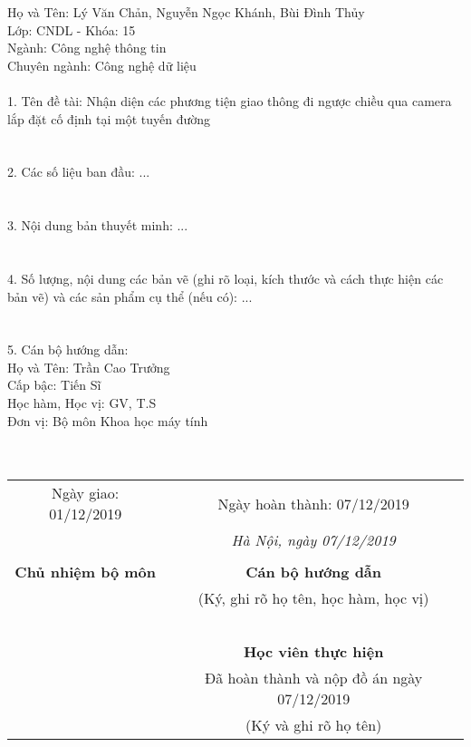 \large{
	\noindent Họ và Tên: Lý Văn Chản, Nguyễn Ngọc Khánh, Bùi Đình Thủy\\
	Lớp: CNDL - Khóa: 15\\
	Ngành: Công nghệ thông tin\\
	Chuyên ngành: Công nghệ dữ liệu\\\\
	1. Tên đề tài: Nhận diện các phương tiện giao thông đi ngược chiều qua camera lắp đặt cố định tại một tuyến đường\\\\\\
	2. Các số liệu ban đầu: ...\\\\\\
	3. Nội dung bản thuyết minh: ...\\\\\\
	4. Số lượng, nội dung các bản vẽ (ghi rõ loại, kích thước và cách thực hiện các bản vẽ) và các sản phẩm cụ thể (nếu có): ...\\\\\\
	5. Cán bộ hướng dẫn:\\
	\indent Họ và Tên: Trần Cao Trưởng\\
	\indent Cấp bậc: Tiến Sĩ\\
	\indent Học hàm, Học vị: GV, T.S\\
	\indent Đơn vị: Bộ môn Khoa học máy tính\\\\\\
}

\hskip-2.0cm
\large
\begin{tabular}{cc}
	Ngày giao: 01/12/2019 & Ngày hoàn thành: 07/12/2019\\
	&\textit{Hà Nội, ngày 07/12/2019}\\
	& \\
	\textbf{Chủ nhiệm bộ môn} & \textbf{Cán bộ hướng dẫn}\\
	& (Ký, ghi rõ họ tên, học hàm, học vị)\\
	& \\
	& \\
	& \\
	& \\
	& \\
	& \textbf{Học viên thực hiện}\\
	& Đã hoàn thành và nộp đồ án ngày 07/12/2019\\
	& (Ký và ghi rõ họ tên)
\end{tabular}
